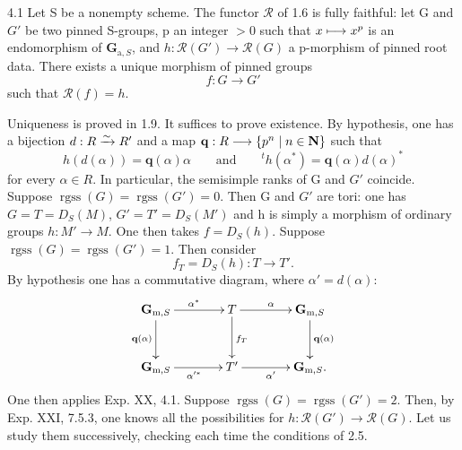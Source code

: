 \begin{theorem}{4.1}\label{XXIII.4.1}
Let S be a nonempty scheme. The functor $\mathscr R$ of 1.6 is fully faithful: let G and $G'$ be two pinned S-groups, p an integer $>0$ such that $x\longmapsto x^p$ is an endomorphism of $\mathbf G_{\mathrm a,S}$, and $h:\mathscr R(G')\to\mathscr R(G)$ a p-morphism of pinned root data. There exists a unique morphism of pinned groups
\[
f:G\to G'
\]
such that $\mathscr R(f)=h$.
\end{theorem}
Uniqueness is proved in 1.9. It suffices to prove existence. By hypothesis, one has a bijection $d:R\xrightarrow{\sim} R'$ and a map $\mathbf q:R\longrightarrow\{p^n\mid n\in\mathbf{N}\}$ such that
\[
h(d(\alpha))=\mathbf q(\alpha)\alpha\qquad\text{and}\qquad {}^th(\alpha^*)=\mathbf q(\alpha)d(\alpha)^*
\]
for every $\alpha\in R$. In particular, the semisimple ranks of G and $G'$ coincide.
Suppose $\operatorname{rgss}(G)=\operatorname{rgss}(G')=0$. Then G and $G'$ are tori: one has $G=T=D_S(M)$, $G'=T'=D_S(M')$ and h is simply a morphism of ordinary groups $h:M'\to M$. One then takes $f=D_S(h)$.
Suppose $\operatorname{rgss}(G)=\operatorname{rgss}(G')=1$. Then consider
\[
f_T=D_S(h):T\to T'.
\]
By hypothesis one has a commutative diagram, where $\alpha'=d(\alpha)$:
\[
\xymatrix@C=3.8em@R=3em{
\mathbf G_{\mathrm m,S}\ar[r]^{\alpha^*}\ar[d]_{\mathbf q(\alpha)}&T\ar[r]^\alpha\ar[d]^{f_T}&\mathbf G_{\mathrm m,S}\ar[d]^{\mathbf q(\alpha)}\\
\mathbf G_{\mathrm m,S}\ar[r]_{\alpha'^*}&T'\ar[r]_{\alpha'}&\mathbf G_{\mathrm m,S}.
}
\]
One then applies Exp. XX, 4.1.
Suppose $\operatorname{rgss}(G)=\operatorname{rgss}(G')=2$. Then, by Exp. XXI, 7.5.3, one knows all the possibilities for $h:\mathscr R(G')\to\mathscr R(G)$. Let us study them successively, checking each time the conditions of 2.5.

